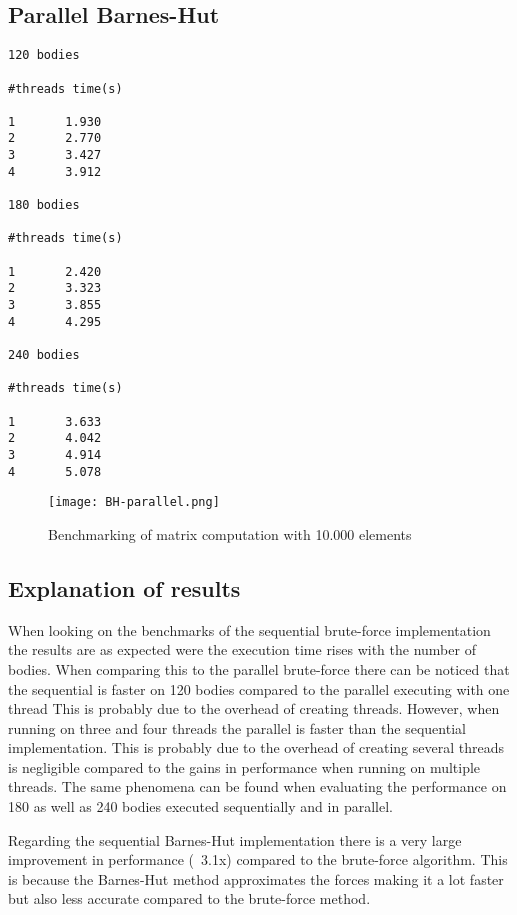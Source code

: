 \documentclass{article}
\begin{document}
\subsection{Parallel Barnes-Hut}
\begin{verbatim}
120 bodies

#threads time(s)

1       1.930
2       2.770
3       3.427
4       3.912

180 bodies

#threads time(s)

1       2.420
2       3.323
3       3.855
4       4.295

240 bodies

#threads time(s)

1       3.633
2       4.042
3       4.914
4       5.078
\end{verbatim}
\begin{figure}[h]
\centering
\texttt{[image: BH-parallel.png]}
\caption{Benchmarking of matrix computation with 10.000 elements}
\end{figure}

\subsection{Explanation of results}
When looking on the benchmarks of the sequential brute-force implementation the results are as expected were the execution time rises with the number of bodies. When comparing this to the parallel brute-force there can be noticed that the sequential is faster on 120 bodies compared to the parallel executing with one thread This is probably due to the overhead of creating threads. However, when running on three and four threads the parallel is faster than the sequential implementation. This is probably due to the overhead of creating several threads is negligible compared to the gains in performance when running on multiple threads. The same phenomena can be found when evaluating the performance on 180 as well as 240 bodies executed sequentially and in parallel. 

Regarding the sequential Barnes-Hut implementation there is a very large improvement in performance (~3.1x) compared to the brute-force algorithm. This is because the Barnes-Hut method approximates the forces making it a lot faster but also less accurate compared to the brute-force method.   
\end{document}
